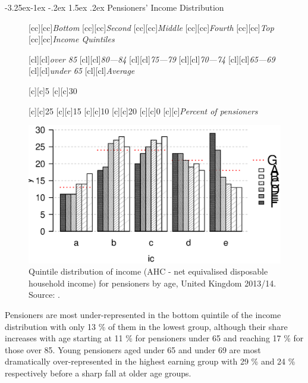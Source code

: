 \documentclass[11 pt, a4paper]{report}
\makeatletter
\renewcommand\subsection{\@startsection{subsection}{2}{\z@}%
                                     {-3.25ex\@plus -1ex \@minus -.2ex}%
                                     {1.5ex \@plus .2ex}%
    								{\large\scshape}}
\makeatother
\begin{document}
\subsection{Pensioners' Income Distribution}
\begin{figure}[hbtp!]

[cc][cc]{\small{\emph{Bottom}}}
[cc][cc]{\small{\emph{Second}}}
[cc][cc]{\small{\emph{Middle}}}
[cc][cc]{\small{\emph{Fourth}}}
[cc][cc]{\small{\emph{Top}}}
[cc][cc]{\small{\emph{Income Quintiles}}}


[cl][cl]{\small{\emph{over 85}}}
[cl][cl]{\small{\emph{80---84}}}
[cl][cl]{\small{\emph{75---79}}}
[cl][cl]{\small{\emph{70---74}}}
[cl][cl]{\small{\emph{65---69}}}
[cl][cl]{\small{\emph{under 65}}}
[cl][cl]{\small{\emph{Average}}}


[c][c]{\small{5}}
[c][c]{\small{30}}

[c][c]{\small{25}}
[c][c]{\small{15}}
[c][c]{\small{10}}
[c][c]{\small{20}}
[c][c]{\small{0}}
[c][c]{\small{\emph{Percent of pensioners}}}

\includegraphics[width=\textwidth]{../figures/Fig8.2.eps}
\caption{Quintile distribution of income (AHC - net equivalised disposable household income) for pensioners by age, United Kingdom 2013/14. Source: \citet{DWP2015b}.}\label{Fig:82} %
\end{figure}

Pensioners are most under-represented in the bottom quintile of the income distribution with only 13 \% of them in the lowest group, although their share increases with age starting at 11 \% for pensioners under 65 and reaching 17 \% for those over 85. Young pensioners aged under 65 and under 69 are most dramatically over-represented in the highest earning group with 29 \% and 24 \% respectively before a sharp fall at older age groups. 
\end{document}
